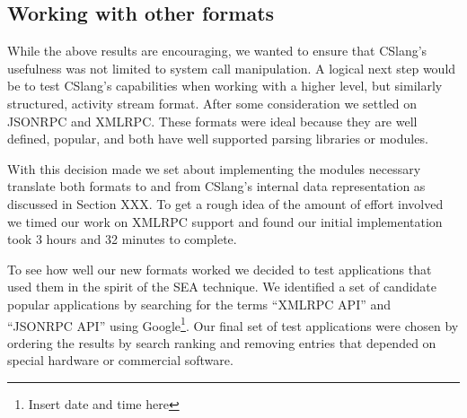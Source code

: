 \subsection{Working with other formats}

While the above results are encouraging, we wanted to ensure that CSlang's
usefulness was not limited to system call manipulation.
A logical next step would be to test CSlang's capabilities when working
with a higher level, but similarly structured, activity stream format.
After some consideration we settled on JSONRPC and XMLRPC.  These formats
were ideal because they are well defined, popular, and both have well
supported parsing libraries or modules.

With this decision made we set about implementing the modules necessary
translate both formats to and from CSlang's internal data representation as
discussed in Section XXX.  To get a rough idea of the amount of effort
involved we timed our work on XMLRPC support and found our initial
implementation took 3 hours and 32 minutes to complete.

To see how well our new formats worked we decided to test applications that
used them in the spirit of the SEA technique.  We identified a set of
candidate popular applications by searching for the terms ``XMLRPC API''
and ``JSONRPC API'' using Google\footnote{Insert date and time here}.  Our
final set of test applications were chosen by ordering the results by search
ranking and removing entries that depended on special hardware or
commercial software.







